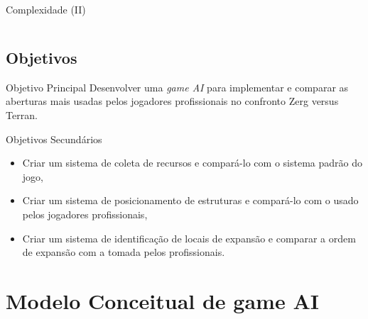 \documentclass{beamer}
\begin{document}
\begin{frame}{Complexidade (II)}
\begin{columns}
\end{columns}
\end{frame}

\subsection{Objetivos}
\begin{frame}{Objetivo Principal}
Desenvolver uma \emph{game AI} para implementar e comparar as aberturas mais usadas pelos jogadores profissionais no confronto Zerg versus Terran.
\end{frame}
\begin{frame}{Objetivos Secundários}
\begin{itemize}
  \item Criar um sistema de coleta de recursos e compará-lo com o sistema padrão do jogo,
  \item Criar um sistema de posicionamento de estruturas e compará-lo com o usado pelos jogadores profissionais,
  \item Criar um sistema de identificação de locais de expansão e comparar a ordem de expansão com a tomada pelos profissionais.
\end{itemize}
\end{frame}
 

\section{Modelo Conceitual de game AI}
\end{document}
